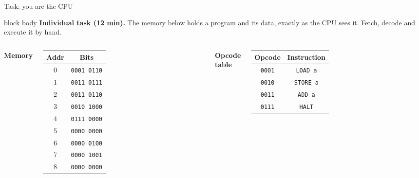 \documentclass[aspectratio=169,10pt]{beamer}
\begin{document}
\begin{frame}{Task: you are the CPU}
  \begin{beamercolorbox}[rounded=true,sep=0.12cm,wd=\textwidth]{block body}
    \centering\small
    \textbf{Individual task (12 min).} The memory below holds a program and its data, exactly as the CPU sees it.
    Fetch, decode and execute it by hand.
  \end{beamercolorbox}
  \vspace{0.12cm}
  \begin{columns}[T,onlytextwidth]
      \centering
      \footnotesize\textbf{Memory}\\[0.05cm]
      \scriptsize
      \renewcommand{\arraystretch}{1.1}
      \begin{tabular}{c|c}
        \toprule
        \textbf{Addr} & \textbf{Bits} \\
        \midrule
        0 & \mbox{\texttt{0001 0110}} \\
        1 & \mbox{\texttt{0011 0111}} \\
        2 & \mbox{\texttt{0011 0110}} \\
        3 & \mbox{\texttt{0010 1000}} \\
        4 & \mbox{\texttt{0111 0000}} \\
        5 & \mbox{\texttt{0000 0000}} \\
        6 & \mbox{\texttt{0000 0100}} \\
        7 & \mbox{\texttt{0000 1001}} \\
        8 & \mbox{\texttt{0000 0000}} \\
        \bottomrule
      \end{tabular}
      \centering
      \footnotesize\textbf{Opcode table}\\[0.05cm]
      \scriptsize
      \renewcommand{\arraystretch}{1.1}
      \begin{tabular}{cc}
        \toprule
        \textbf{Opcode} & \textbf{Instruction} \\
        \midrule
        \texttt{0001} & \texttt{LOAD a} \\
        \texttt{0010} & \texttt{STORE a} \\
        \texttt{0011} & \texttt{ADD a} \\
        \texttt{0111} & \texttt{HALT} \\
        \bottomrule
      \end{tabular}\\[0.08cm]

\end{columns}
\end{frame}
\end{document}
